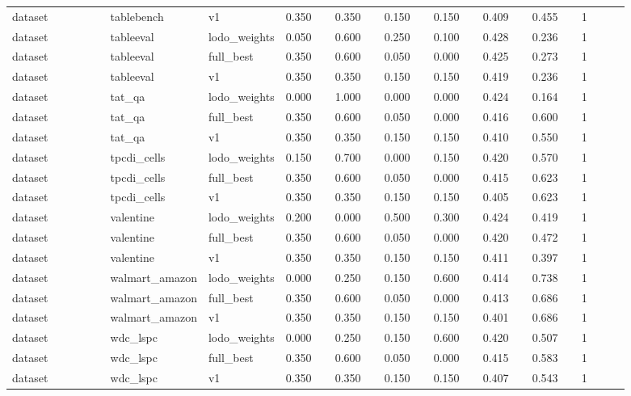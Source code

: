 \begin{landscape}
\begin{longtable}{p{0.162\linewidth}p{0.081\linewidth}p{0.081\linewidth}p{0.081\linewidth}p{0.081\linewidth}p{0.081\linewidth}p{0.081\linewidth}p{0.081\linewidth}p{0.081\linewidth}p{0.081\linewidth}}
dataset & tablebench & v1 & 0.350 & 0.350 & 0.150 & 0.150 & 0.409 & 0.455 & 1 \\
dataset & tableeval & lodo\_\allowbreak{}weights & 0.050 & 0.600 & 0.250 & 0.100 & 0.428 & 0.236 & 1 \\
dataset & tableeval & full\_\allowbreak{}best & 0.350 & 0.600 & 0.050 & 0.000 & 0.425 & 0.273 & 1 \\
dataset & tableeval & v1 & 0.350 & 0.350 & 0.150 & 0.150 & 0.419 & 0.236 & 1 \\
dataset & tat\_\allowbreak{}qa & lodo\_\allowbreak{}weights & 0.000 & 1.000 & 0.000 & 0.000 & 0.424 & 0.164 & 1 \\
dataset & tat\_\allowbreak{}qa & full\_\allowbreak{}best & 0.350 & 0.600 & 0.050 & 0.000 & 0.416 & 0.600 & 1 \\
dataset & tat\_\allowbreak{}qa & v1 & 0.350 & 0.350 & 0.150 & 0.150 & 0.410 & 0.550 & 1 \\
dataset & tpcdi\_\allowbreak{}cells & lodo\_\allowbreak{}weights & 0.150 & 0.700 & 0.000 & 0.150 & 0.420 & 0.570 & 1 \\
dataset & tpcdi\_\allowbreak{}cells & full\_\allowbreak{}best & 0.350 & 0.600 & 0.050 & 0.000 & 0.415 & 0.623 & 1 \\
dataset & tpcdi\_\allowbreak{}cells & v1 & 0.350 & 0.350 & 0.150 & 0.150 & 0.405 & 0.623 & 1 \\
dataset & valentine & lodo\_\allowbreak{}weights & 0.200 & 0.000 & 0.500 & 0.300 & 0.424 & 0.419 & 1 \\
dataset & valentine & full\_\allowbreak{}best & 0.350 & 0.600 & 0.050 & 0.000 & 0.420 & 0.472 & 1 \\
dataset & valentine & v1 & 0.350 & 0.350 & 0.150 & 0.150 & 0.411 & 0.397 & 1 \\
dataset & walmart\_\allowbreak{}amazon & lodo\_\allowbreak{}weights & 0.000 & 0.250 & 0.150 & 0.600 & 0.414 & 0.738 & 1 \\
dataset & walmart\_\allowbreak{}amazon & full\_\allowbreak{}best & 0.350 & 0.600 & 0.050 & 0.000 & 0.413 & 0.686 & 1 \\
dataset & walmart\_\allowbreak{}amazon & v1 & 0.350 & 0.350 & 0.150 & 0.150 & 0.401 & 0.686 & 1 \\
dataset & wdc\_\allowbreak{}lspc & lodo\_\allowbreak{}weights & 0.000 & 0.250 & 0.150 & 0.600 & 0.420 & 0.507 & 1 \\
dataset & wdc\_\allowbreak{}lspc & full\_\allowbreak{}best & 0.350 & 0.600 & 0.050 & 0.000 & 0.415 & 0.583 & 1 \\
dataset & wdc\_\allowbreak{}lspc & v1 & 0.350 & 0.350 & 0.150 & 0.150 & 0.407 & 0.543 & 1 \\

\end{longtable}
\end{landscape}
